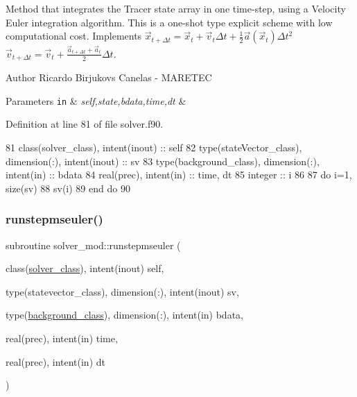 Method that integrates the Tracer state array in one time-\/step, using a Velocity Euler integration algorithm. This is a one-\/shot type explicit scheme with low computational cost. Implements $ {\vec {x}}_{t+\Delta t}={\vec {x}}_{t}+{\vec {v}}_{t}\Delta t+{\frac {1}{2}}{\vec {a}}({\vec {x}}_{t})\Delta t^{2}$ $ {\vec {v}}_{t+\Delta t}={\vec {v}}_{t}+\frac{{\vec {a}}_{t+\Delta t}+{\vec {a}}_{t}}{2}\Delta t$. 

\begin{DoxyAuthor}{Author}
Ricardo Birjukovs Canelas -\/ M\+A\+R\+E\+T\+EC 
\end{DoxyAuthor}

\begin{DoxyParams}[1]{Parameters}
\mbox{\tt in}  & {\em self,state,bdata,time,dt} & \\
\hline
\end{DoxyParams}


Definition at line 81 of file solver.\+f90.


\begin{DoxyCode}
81     \textcolor{keywordtype}{class}(solver\_class), \textcolor{keywordtype}{intent(inout)} :: self
82     \textcolor{keywordtype}{type}(stateVector\_class), \textcolor{keywordtype}{dimension(:)}, \textcolor{keywordtype}{intent(inout)} :: sv
83     \textcolor{keywordtype}{type}(background\_class), \textcolor{keywordtype}{dimension(:)}, \textcolor{keywordtype}{intent(in)} :: bdata
84     \textcolor{keywordtype}{real(prec)}, \textcolor{keywordtype}{intent(in)} :: time, dt
85     \textcolor{keywordtype}{integer} :: i
86 
87     \textcolor{keywordflow}{do} i=1, \textcolor{keyword}{size}(sv)
88         sv(i)%
89 \textcolor{keywordflow}{    end do}
90 
\end{DoxyCode}
\mbox{\label{namespacesolver__mod_ae574f8d772b89d5c3c602db278c05325}} 
\subsubsection{\texorpdfstring{runstepmseuler()}{runstepmseuler()}}
{\footnotesize\ttfamily subroutine solver\+\_\+mod\+::runstepmseuler (\begin{DoxyParamCaption}\item[{class(\mbox{\hyperlink{structsolver__mod_1_1solver__class}{solver\+\_\+class}}), intent(inout)}]{self,  }\item[{type(statevector\+\_\+class), dimension(\+:), intent(inout)}]{sv,  }\item[{type(\mbox{\hyperlink{structbackground__mod_1_1background__class}{background\+\_\+class}}), dimension(\+:), intent(in)}]{bdata,  }\item[{real(prec), intent(in)}]{time,  }\item[{real(prec), intent(in)}]{dt }\end{DoxyParamCaption})\hspace{0.3cm}{\ttfamily [private]}}



